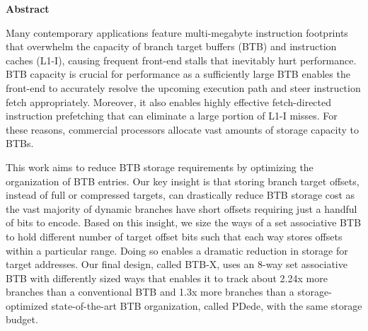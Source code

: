 \documentclass[../../../main.tex]{subfiles}
\begin{document}
\begin{center}
  \textbf{Abstract}
  \end{center}
\begin{changemargin}{0.75cm}{0.75cm}
Many contemporary applications feature multi-megabyte instruction footprints that overwhelm the capacity of branch target buffers (BTB) and instruction caches (L1-I), causing frequent front-end stalls that inevitably hurt performance. BTB capacity is crucial for performance as a sufficiently large BTB enables the front-end to accurately resolve the upcoming execution path and steer instruction fetch appropriately. Moreover, it also enables highly effective fetch-directed instruction prefetching that can eliminate a large portion of L1-I misses. For these reasons, commercial processors allocate vast amounts of storage capacity to BTBs.

This work aims to reduce BTB storage requirements by optimizing the organization of BTB entries. Our key insight is that storing branch target offsets, instead of full or compressed targets, can drastically reduce BTB storage cost as the vast majority of dynamic branches have short offsets requiring just a handful of bits to encode. Based on this insight, we size the ways of a set associative BTB to hold different number of target offset bits such that each way stores offsets within a particular range. Doing so enables a dramatic reduction in storage for target addresses. Our final design, called BTB-X, uses an 8-way set associative BTB with differently sized ways that enables it to track about 2.24x more branches than a conventional BTB and 1.3x more branches than a storage-optimized state-of-the-art BTB organization, called PDede, with the same storage budget.
\end{changemargin}

\vspace{1cm}

\begin{refsection}
  
  \printbibliography[heading=refs]

  \begin{subappendices}
    
  \end{subappendices}

\end{refsection}
\FloatBarrier
\end{document}
